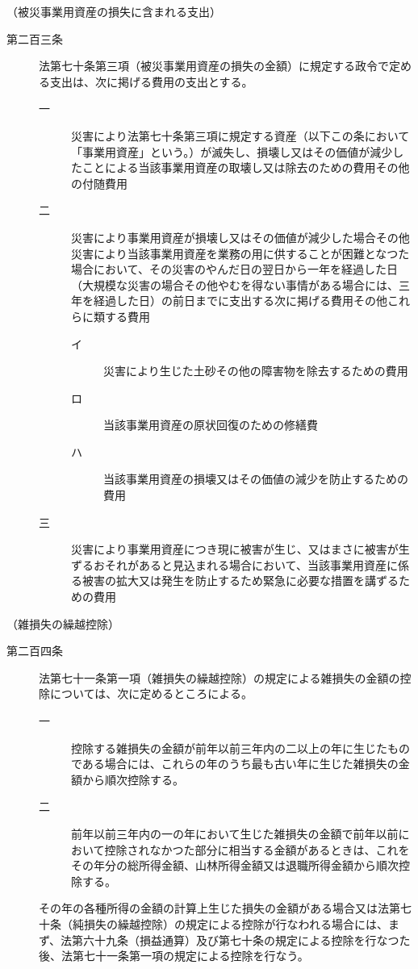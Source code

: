 \documentclass[twocolumn,a4j,10pt]{ltjtarticle}
\begin{document}
\noindent\hspace{10pt}（被災事業用資産の損失に含まれる支出）
\begin{description}
\item[第二百三条]法第七十条第三項（被災事業用資産の損失の金額）に規定する政令で定める支出は、次に掲げる費用の支出とする。
\begin{description}
\item[一]災害により法第七十条第三項に規定する資産（以下この条において「事業用資産」という。）が滅失し、損壊し又はその価値が減少したことによる当該事業用資産の取壊し又は除去のための費用その他の付随費用
\item[二]災害により事業用資産が損壊し又はその価値が減少した場合その他災害により当該事業用資産を業務の用に供することが困難となつた場合において、その災害のやんだ日の翌日から一年を経過した日（大規模な災害の場合その他やむを得ない事情がある場合には、三年を経過した日）の前日までに支出する次に掲げる費用その他これらに類する費用
\begin{description}
\item[イ]災害により生じた土砂その他の障害物を除去するための費用
\item[ロ]当該事業用資産の原状回復のための修繕費
\item[ハ]当該事業用資産の損壊又はその価値の減少を防止するための費用
\end{description}
\item[三]災害により事業用資産につき現に被害が生じ、又はまさに被害が生ずるおそれがあると見込まれる場合において、当該事業用資産に係る被害の拡大又は発生を防止するため緊急に必要な措置を講ずるための費用
\end{description}
\end{description}
\noindent\hspace{10pt}（雑損失の繰越控除）
\begin{description}
\item[第二百四条]法第七十一条第一項（雑損失の繰越控除）の規定による雑損失の金額の控除については、次に定めるところによる。
\begin{description}
\item[一]控除する雑損失の金額が前年以前三年内の二以上の年に生じたものである場合には、これらの年のうち最も古い年に生じた雑損失の金額から順次控除する。
\item[二]前年以前三年内の一の年において生じた雑損失の金額で前年以前において控除されなかつた部分に相当する金額があるときは、これをその年分の総所得金額、山林所得金額又は退職所得金額から順次控除する。
\end{description}
\item[]その年の各種所得の金額の計算上生じた損失の金額がある場合又は法第七十条（純損失の繰越控除）の規定による控除が行なわれる場合には、まず、法第六十九条（損益通算）及び第七十条の規定による控除を行なつた後、法第七十一条第一項の規定による控除を行なう。
\end{description}
\end{document}
